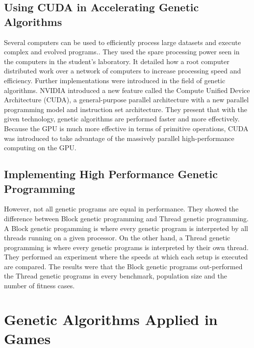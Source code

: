 \subsection{Using CUDA in Accelerating Genetic Algorithms}
Several computers can be used to efficiently process large datasets and execute complex
and evolved programs.\cite{Harding09}. They used the spare processing power seen in the
computers in the student's laboratory. It detailed how a root computer distributed work
over a network of computers to increase processing speed and efficiency. Further
implementations were introduced in the field of genetic algorithms. NVIDIA introduced a new 
feature called the Compute Unified Device Architecture (CUDA),
a general-purpose parallel architecture with a new parallel programming model and instruction
set architecture\cite{Zhang09}. They present that with the given technology, genetic algorithms
are performed faster and more effectively. Because the GPU is much more effective in terms of primitive
operations, CUDA was introduced to take advantage of the massively parallel high-performance
computing on the GPU.  

\subsection{Implementing High Performance Genetic Programming}
However, not all genetic programs are equal in performance. They showed the difference between
Block genetic programming and Thread genetic programming\cite{Robbilliard09}. A Block
genetic progamming is where every genetic program is interpreted by all threads running
on a given processor. On the other hand, a Thread genetic programming is where every genetic
programs is interpreted by their own thread. They performed an experiment where
the speeds at which each setup is executed are compared. The results were that the Block genetic
programs out-performed the Thread genetic programs in every benchmark, population size and
the number of fitness cases.

\section{Genetic Algorithms Applied in Games}
